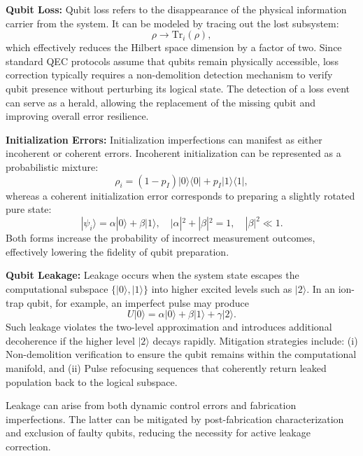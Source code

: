 \documentclass[conference]{IEEEtran}
\begin{document}
\textbf{Qubit Loss:} Qubit loss refers to the disappearance of the physical information carrier from the system. It can be modeled by tracing out the lost subsystem:
\begin{equation}
\rho \rightarrow \mathrm{Tr}_i(\rho),
\end{equation}
which effectively reduces the Hilbert space dimension by a factor of two.  
Since standard QEC protocols assume that qubits remain physically accessible, loss correction typically requires a non-demolition detection mechanism to verify qubit presence without perturbing its logical state. The detection of a loss event can serve as a herald, allowing the replacement of the missing qubit and improving overall error resilience.

\textbf{Initialization Errors:} Initialization imperfections can manifest as either incoherent or coherent errors. Incoherent initialization can be represented as a probabilistic mixture:
\begin{equation}
\rho_i = (1-p_I)|0\rangle\langle 0| + p_I |1\rangle\langle 1|,
\end{equation}
whereas a coherent initialization error corresponds to preparing a slightly rotated pure state:
\begin{equation}
|\psi_i\rangle = \alpha|0\rangle + \beta|1\rangle, \quad |\alpha|^2 + |\beta|^2 = 1, \quad |\beta|^2 \ll 1.
\end{equation}
Both forms increase the probability of incorrect measurement outcomes, effectively lowering the fidelity of qubit preparation.

\textbf{Qubit Leakage:} Leakage occurs when the system state escapes the computational subspace $\{|0\rangle, |1\rangle\}$ into higher excited levels such as $|2\rangle$. In an ion-trap qubit, for example, an imperfect pulse may produce
\begin{equation}
U|0\rangle = \alpha|0\rangle + \beta|1\rangle + \gamma|2\rangle.
\end{equation}
Such leakage violates the two-level approximation and introduces additional decoherence if the higher level $|2\rangle$ decays rapidly.  
Mitigation strategies include:  
(i) Non-demolition verification to ensure the qubit remains within the computational manifold, and  
(ii) Pulse refocusing sequences that coherently return leaked population back to the logical subspace.  

Leakage can arise from both dynamic control errors and fabrication imperfections. The latter can be mitigated by post-fabrication characterization and exclusion of faulty qubits, reducing the necessity for active leakage correction.
\end{document}
